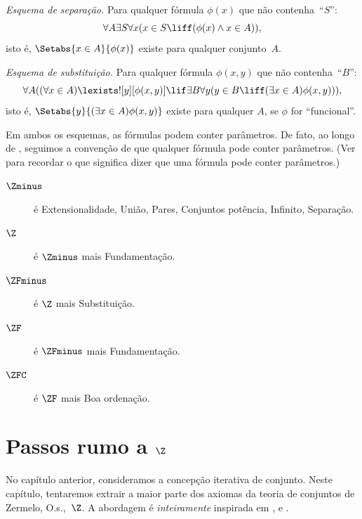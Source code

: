 \begin{defish}
\emph{Esquema de separação.}
Para qualquer fórmula $\phi(x)$ que não contenha~``$S$'':
\[
\forall A \exists S \forall x(x \in S \liff (\phi(x) \land x \in A)),
\]
isto é, $\Setabs{x \in A}{\phi(x)}$ existe para qualquer conjunto~$A$.
\end{defish}

\begin{defish}
\emph{Esquema de substituição.} Para qualquer fórmula $\phi(x, y)$ que não contenha~``$B$'':
\[
\forall A((\forall x \in A)\lexists![y][\phi(x,y)] \lif \exists B \forall y (y \in B \liff (\exists x \in A)\phi(x,y))),
\]
isto é, $\Setabs{y}{(\exists x \in A)\phi(x,y)}$ existe para qualquer $A$, se $\phi$ for ``funcional''.
\end{defish}

Em ambos os esquemas, as fórmulas podem conter parâmetros. De fato,
ao longo de , seguimos a convenção de que qualquer
fórmula pode conter parâmetros. (Ver
 para recordar o que significa dizer
que uma fórmula pode conter parâmetros.)

\begin{description}
\item[$\Zminus$] é Extensionalidade, União, Pares, Conjuntos potência, Infinito, Separação.
\item[$\Z$] é $\Zminus$ mais Fundamentação.
\item[$\ZFminus$] é $\Z$ mais Substituição.
\item[$\ZF$] é $\ZFminus$ mais Fundamentação.
\item[$\ZFC$] é $\ZF$ mais Boa ordenação.
\end{description}


\chapter{Passos rumo a $\Z$}

No capítulo anterior, consideramos a concepção iterativa de conjunto.
Neste capítulo, tentaremos extrair a maior parte dos axiomas da teoria de
conjuntos de Zermelo, O.s.\@,~$\Z$. A abordagem é \emph{inteiramente}
inspirada em \citet{Boolos1971}, \citet{Scott1974} e
\citet{Shoenfield:AST}. 

\olresetchapter


